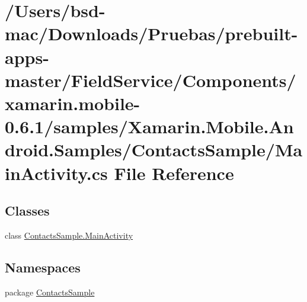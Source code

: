 \hypertarget{xamarin_8mobile-0_86_81_2samples_2_xamarin_8_mobile_8_android_8_samples_2_contacts_sample_2_main_activity_8cs}{\section{/\+Users/bsd-\/mac/\+Downloads/\+Pruebas/prebuilt-\/apps-\/master/\+Field\+Service/\+Components/xamarin.mobile-\/0.6.1/samples/\+Xamarin.Mobile.\+Android.\+Samples/\+Contacts\+Sample/\+Main\+Activity.cs File Reference}
\label{xamarin_8mobile-0_86_81_2samples_2_xamarin_8_mobile_8_android_8_samples_2_contacts_sample_2_main_activity_8cs}
}
\subsection*{Classes}
\begin{DoxyCompactItemize}
\item 
class \hyperlink{class_contacts_sample_1_1_main_activity}{Contacts\+Sample.\+Main\+Activity}
\end{DoxyCompactItemize}
\subsection*{Namespaces}
\begin{DoxyCompactItemize}
\item 
package \hyperlink{namespace_contacts_sample}{Contacts\+Sample}
\end{DoxyCompactItemize}
